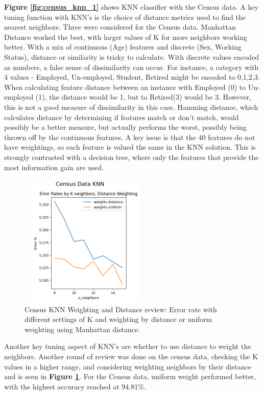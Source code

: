 \documentclass[letterpaper]{article} %
\begin{document}
\textbf{Figure \ref{fig:census_knn_1}} shows KNN classifier with the Census data.  A key tuning function with KNN's is the choice of distance metrics used to find the nearest neighbors.  Three were considered for the Census data.  Manhattan Distance worked the best, with larger values of K for more neighbors working better.  With a mix of continuous (Age) features and discrete (Sex, Working Status), distance or similarity is tricky to calculate.  With discrete values encoded as numbers, a false sense of dissimilarity can occur.  For instance, a category with 4 values - Employed, Un-employed, Student, Retired might be encoded to 0,1,2,3.  When calculating feature distance between an instance with Employed (0) to Un-employed (1), the distance would be 1, but to Retired(3) would be 3.  However, this is not a good measure of dissimilarity in this case.  Hamming distance, which calculates distance by determining if features match or don't match, would possibly be a better measure, but actually performs the worst, possibly being thrown off by the continuous features.  A key issue is that the 40 features do not have weightings, so each feature is valued the same in the KNN solution.  This is strongly contrasted with a decision tree, where only the features that provide the most information gain are used.

\begin{figure}[h]
\centering
\includegraphics[width=2.5in, height=2.5in]{figures/Census_Data_KNN_knn_2.png}
\caption{Census KNN Weighting and Distance review:  Error rate with different settings of K and weighting by distance or uniform weighting using Manhattan distance.  }
\label{fig:census_knn_2}
\end{figure}

Another key tuning aspect of KNN's are whether to use distance to weight the neighbors.  Another round of review was done on the census data, checking the K values in a higher range, and considering weighting neighbors by their distance and is seen in \textbf{Figure \ref{fig:census_knn_2}}.  For the Census data, uniform weight performed better, with the highest accuracy reached at 94.81\%.
\end{document}
